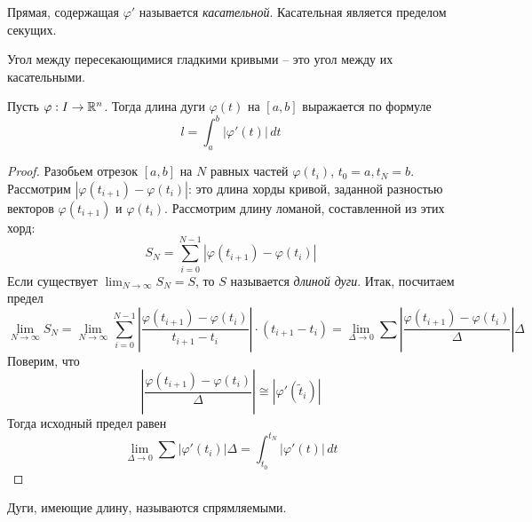 \begin{Def}
	Прямая, содержащая $\varphi'$ называется \textit{касательной}. Касательная является пределом секущих.
\end{Def}

\begin{Def}
	Угол между пересекающимися гладкими кривыми -- это угол между их касательными.
\end{Def}


\begin{figure}[H]
	\centering
	\def\svgwidth{.5\columnwidth}
	
\end{figure}

\begin{Thm}
	Пусть $\varphi : I \to \mathbb{R}^n$. Тогда длина дуги $\varphi(t)$ на $[a, b]$ выражается по формуле
	\[l = \int_{a}^{b} |\varphi'(t)|\,dt\]
\end{Thm}

\begin{proof}
	Разобьем отрезок $[a, b]$ на $N$ равных частей $\varphi(t_i)$, $t_0 = a, t_N = b$.
	Рассмотрим $|\varphi(t_{i + 1}) - \varphi(t_i)|$: это длина хорды кривой, заданной разностью векторов $\varphi(t_{i + 1})$ и $\varphi(t_i)$.
	Рассмотрим длину ломаной, составленной из этих хорд:
	\[S_N = \sum_{i=0}^{N - 1} |\varphi(t_{i + 1}) - \varphi(t_i)|\]
	Если существует $\lim_{N \to \infty} S_N = S$, то $S$ называется \textit{длиной дуги}. Итак, посчитаем предел
	\[\lim_{N \to \infty} S_N = \lim_{N \to \infty} \sum_{i=0}^{N - 1} \left| \frac{\varphi(t_{i + 1}) - \varphi(t_i)}{t_{i + 1} - t_i}\right| \cdot (t_{i + 1} - t_i) = \lim_{\Delta \to 0} \sum\left| \frac{\varphi(t_{i + 1}) - \varphi(t_i)}{\Delta}\right| \Delta\]
	Поверим, что 
	\[\left|\frac{\varphi(t_{i + 1}) - \varphi(t_i)}{\Delta}\right| \cong |\varphi'(\widetilde{t}_i)|\]
	Тогда исходный предел равен
	\[\lim_{\Delta \to 0} \sum |\varphi'(t_i)|\Delta = \int_{t_0}^{t_N} |\varphi'(t)|\,dt\]  
\end{proof}

\begin{Def}
	Дуги, имеющие длину, называются спрямляемыми.
\end{Def}


